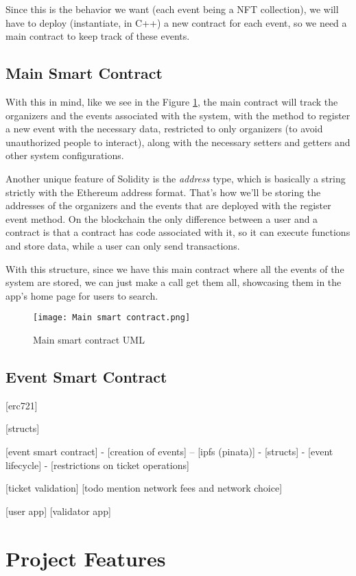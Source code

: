 Since this is the behavior we want (each event being a NFT collection), we will have to deploy (instantiate, in C++) a new contract for each event, so we need a main contract to keep track of these events.

\subsection{Main Smart Contract}
\label{subsec:main_smart_contract}

With this in mind, like we see in the Figure \ref{fig:main_smart_contract}, the main contract will track the organizers and the events associated with the system, with the method to register a new event with the necessary data, restricted to only organizers (to avoid unauthorized people to interact), along with the necessary setters and getters and other system configurations.

Another unique feature of Solidity is the \textit{address} type, which is basically a string strictly with the Ethereum address format. That's how we'll be storing the addresses of the organizers and the events that are deployed with the register event method. On the blockchain the only difference between a user and a contract is that a contract has code associated with it, so it can execute functions and store data, while a user can only send transactions.

With this structure, since we have this main contract where all the events of the system are stored, we can just make a call get them all, showcasing them in the app's home page for users to search.

\begin{figure}[H]
    \texttt{[image: Main smart contract.png]}
    \centering
    \caption{Main smart contract UML}
    \label{fig:main_smart_contract}
\end{figure}


\subsection{Event Smart Contract}
\label{subsec:event_smart_contract}


[erc721]

[structs]

[event smart contract]
- [creation of events]
-- [ipfs (pinata)]
- [structs]
- [event lifecycle]
- [restrictions on ticket operations]

[ticket validation]
[todo mention network fees and network choice]

[user app]
[validator app]

\section{Project Features}
